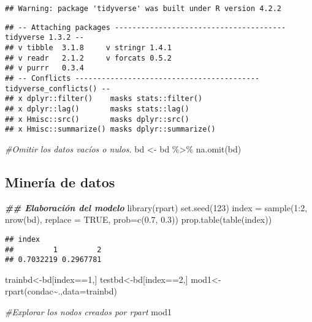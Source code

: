 \documentclass[
]{article}
\newenvironment{Shaded}{\begin{snugshade}}{\end{snugshade}}
\newcommand{\AttributeTok}[1]{\textcolor[rgb]{0.77,0.63,0.00}{#1}}
\newcommand{\CommentTok}[1]{\textcolor[rgb]{0.56,0.35,0.01}{\textit{#1}}}
\newcommand{\ConstantTok}[1]{\textcolor[rgb]{0.00,0.00,0.00}{#1}}
\newcommand{\DecValTok}[1]{\textcolor[rgb]{0.00,0.00,0.81}{#1}}
\newcommand{\DocumentationTok}[1]{\textcolor[rgb]{0.56,0.35,0.01}{\textbf{\textit{#1}}}}
\newcommand{\FloatTok}[1]{\textcolor[rgb]{0.00,0.00,0.81}{#1}}
\newcommand{\FunctionTok}[1]{\textcolor[rgb]{0.00,0.00,0.00}{#1}}
\newcommand{\NormalTok}[1]{#1}
\newcommand{\OtherTok}[1]{\textcolor[rgb]{0.56,0.35,0.01}{#1}}
\newcommand{\SpecialCharTok}[1]{\textcolor[rgb]{0.00,0.00,0.00}{#1}}
\begin{document}
\begin{verbatim}
## Warning: package 'tidyverse' was built under R version 4.2.2
\end{verbatim}

\begin{verbatim}
## -- Attaching packages --------------------------------------- tidyverse 1.3.2 --
## v tibble  3.1.8     v stringr 1.4.1
## v readr   2.1.2     v forcats 0.5.2
## v purrr   0.3.4     
## -- Conflicts ------------------------------------------ tidyverse_conflicts() --
## x dplyr::filter()    masks stats::filter()
## x dplyr::lag()       masks stats::lag()
## x Hmisc::src()       masks dplyr::src()
## x Hmisc::summarize() masks dplyr::summarize()
\end{verbatim}

\begin{Shaded}
\begin{Highlighting}[]
\CommentTok{\#Omitir los datos vacíos o nulos.}
\NormalTok{bd }\OtherTok{\textless{}{-}}\NormalTok{ bd }\SpecialCharTok{\%\textgreater{}\%} \FunctionTok{na.omit}\NormalTok{(bd)}
\end{Highlighting}
\end{Shaded}

\hypertarget{mineruxeda-de-datos}{%
\subsection{Minería de datos}\label{mineruxeda-de-datos}}

\begin{Shaded}
\begin{Highlighting}[]
\DocumentationTok{\#\# Elaboración del modelo}
\FunctionTok{library}\NormalTok{(rpart)}
\FunctionTok{set.seed}\NormalTok{(}\DecValTok{123}\NormalTok{)}
\NormalTok{index }\OtherTok{=} \FunctionTok{sample}\NormalTok{(}\DecValTok{1}\SpecialCharTok{:}\DecValTok{2}\NormalTok{, }\FunctionTok{nrow}\NormalTok{(bd), }\AttributeTok{replace =} \ConstantTok{TRUE}\NormalTok{, }\AttributeTok{prob=}\FunctionTok{c}\NormalTok{(}\FloatTok{0.7}\NormalTok{, }\FloatTok{0.3}\NormalTok{))}
\FunctionTok{prop.table}\NormalTok{(}\FunctionTok{table}\NormalTok{(index))}
\end{Highlighting}
\end{Shaded}

\begin{verbatim}
## index
##         1         2 
## 0.7032219 0.2967781
\end{verbatim}

\begin{Shaded}
\begin{Highlighting}[]
\NormalTok{trainbd}\OtherTok{\textless{}{-}}\NormalTok{bd[index}\SpecialCharTok{==}\DecValTok{1}\NormalTok{,]}
\NormalTok{testbd}\OtherTok{\textless{}{-}}\NormalTok{bd[index}\SpecialCharTok{==}\DecValTok{2}\NormalTok{,]}
\NormalTok{mod1}\OtherTok{\textless{}{-}}\FunctionTok{rpart}\NormalTok{(condac}\SpecialCharTok{\textasciitilde{}}\NormalTok{.,}\AttributeTok{data=}\NormalTok{trainbd)}

\CommentTok{\#Explorar los nodos creados por rpart}
\NormalTok{mod1}
\end{Highlighting}
\end{Shaded}
\end{document}
